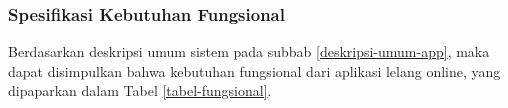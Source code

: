   \subsubsection{Spesifikasi Kebutuhan Fungsional}
  \label{keb-fungsional}
	Berdasarkan deskripsi umum sistem pada subbab \ref{deskripsi-umum-app}, maka dapat disimpulkan bahwa kebutuhan fungsional dari aplikasi lelang online, yang dipaparkan dalam Tabel \ref{tabel-fungsional}.

  